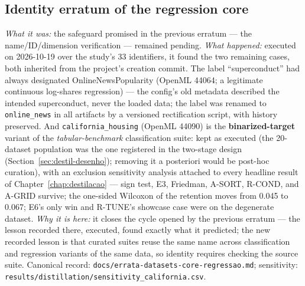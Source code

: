 \subsection{Identity erratum of the regression core}
\emph{What it was:} the safeguard promised in the previous erratum
--- the name/ID/dimension verification --- remained pending.
\emph{What happened:} executed on 2026-10-19 over the study's 33
identifiers, it found the two remaining cases, both inherited from
the project's creation commit. The label ``superconduct'' had always
designated OnlineNewsPopularity (OpenML 44064; a legitimate
continuous log-shares regression) --- the config's old metadata
described the intended superconduct, never the loaded data; the
label was renamed to \texttt{online\_news} in all artifacts by a
versioned rectification script, with history preserved. And
\texttt{california\_\allowbreak housing} (OpenML 44090) is the
\textbf{binarized-target} variant of the \emph{tabular-benchmark}
classification suite: kept as executed (the 20-dataset population
was the one registered in the two-stage design
(Section~\ref{sec:destil-desenho}); removing it a posteriori would
be post-hoc curation), with an exclusion sensitivity analysis
attached to every headline result of Chapter~\ref{chap:destilacao}
--- sign test, E3, Friedman, A-SORT, R-COND, and A-GRID survive; the
one-sided Wilcoxon of the retention moves from 0.045 to 0.067; E6's
only win and R-TUNE's showcase case were on the degenerate dataset.
\emph{Why it is here:} it closes the cycle opened by the previous
erratum --- the lesson recorded there, executed, found exactly what
it predicted; the new recorded lesson is that curated suites reuse
the same name across classification and regression variants of the
same data, so identity requires checking the source suite. Canonical
record:
\texttt{docs/\allowbreak errata-\allowbreak datasets-\allowbreak core-\allowbreak regressao.\allowbreak md};
sensitivity:
\texttt{results/\allowbreak distillation/\allowbreak sensitivity\_\allowbreak california.\allowbreak csv}.

